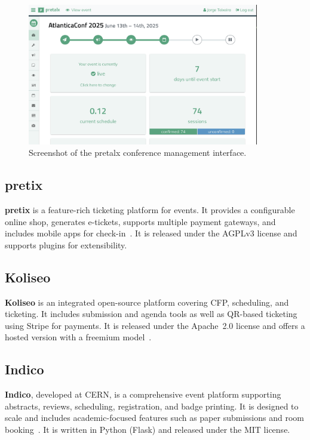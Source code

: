 \begin{figure}[h!]
  \centering
  \includegraphics[width=0.9\textwidth]{imaxes/pretalx.com-ui.png}
  \caption{Screenshot of the pretalx conference management interface.}
  \label{fig:pretalx-ui}
\end{figure}

\subsection*{pretix}
\textbf{pretix} is a feature-rich ticketing platform for events. It provides a configurable online shop, generates e-tickets, supports multiple payment gateways, and includes mobile apps for check-in~\cite{pretix-docs}. It is released under the AGPLv3 license and supports plugins for extensibility.

\subsection*{Koliseo}
\textbf{Koliseo} is an integrated open-source platform covering CFP, scheduling, and ticketing. It includes submission and agenda tools as well as QR-based ticketing using Stripe for payments. It is released under the Apache~2.0 license and offers a hosted version with a freemium model~\cite{koliseo-website}.

\subsection*{Indico}
\textbf{Indico}, developed at CERN, is a comprehensive event platform supporting abstracts, reviews, scheduling, registration, and badge printing. It is designed to scale and includes academic-focused features such as paper submissions and room booking~\cite{indico-github}. It is written in Python (Flask) and released under the MIT license.

